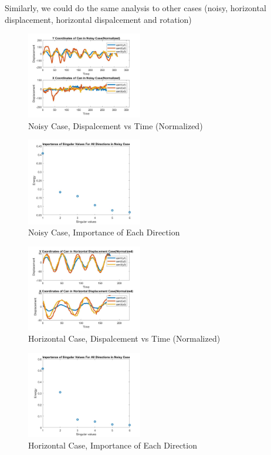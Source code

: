 \documentclass[twoside,twocolumn]{article}
\begin{document}
    Similarly, we could do the same analysis to other cases (noisy, horizontal displacement, horizontal dispalcement and rotation)
    \begin{figure}[h]
        \includegraphics[width = 0.45\textwidth]{test2_1.jpg}
        \caption{Noisy Case, Dispalcement vs Time (Normalized)}
        \label{fig:test2_1}
    \end{figure}
    \begin{figure}[h]
        \includegraphics[width = 0.45\textwidth]{test2_2.jpg}
        \caption{Noisy Case, Importance of Each Direction}
        \label{fig:test2_2}
    \end{figure}
    \begin{figure}[h]
        \includegraphics[width = 0.45\textwidth]{test3_1.jpg}
        \caption{Horizontal Case, Dispalcement vs Time (Normalized)}
        \label{fig:test3_1}
    \end{figure}
    \begin{figure}[h]
        \includegraphics[width = 0.45\textwidth]{test3_2.jpg}
        \caption{Horizontal Case, Importance of Each Direction}
        \label{fig:test3_2}
    \end{figure}
\end{document}

